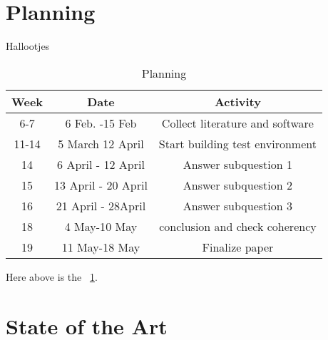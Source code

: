 \documentclass{sig-alternate-br}
\begin{document}
\section{Planning}

Hallootjes
\begin{table}
	\centering \caption{Planning}
	\begin{tabular}{|c|c|c|} \hline
		\textbf{Week} & \textbf{Date} & \textbf{Activity} \\ \hline 
		6-7&6 Feb. -15 Feb&Collect literature and software\\ \hline 
		11-14&5 March 12 April&Start building test environment\\ \hline
		14&6 April - 12 April&Answer subquestion 1\\ \hline
		15&13 April - 20 April&Answer subquestion 2\\ \hline
		16&21 April - 28April&Answer subquestion 3\\ \hline
		18&4 May-10 May& conclusion and check coherency \\ \hline
		19&11 May-18 May& Finalize paper \\ \hline
		\end{tabular}
		\label{tab:planning}
\end{table}
Here above is the ~\ref{tab:planning}.

\section{State of the Art}


%


%
%
\vspace{50 mm}
\newpage
\end{document}
